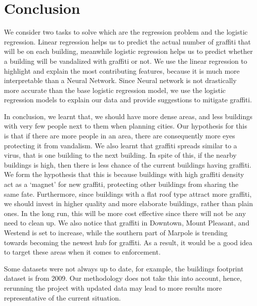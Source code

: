\chapter{Conclusion}

We consider two tasks to solve which are the regression problem and the logistic regression. Linear regression helps us to predict the actual number of graffiti that will be on each building, meanwhile logistic regression helps us to predict whether a building will be vandalized with graffiti or not. We use the linear regression to highlight and explain the most contributing features, because it is much more interpretable than a Neural Network. Since Neural network is not drastically more accurate than the base logistic regression model, we use the logistic regression models to explain our data and provide suggestions to mitigate graffiti.

In conclusion, we learnt that, we should have more dense areas, and less buildings with very few people next to them when planning cities. Our hypothesis for this is that if there are more people in an area, there are consequently more eyes protecting it from vandalism. We also learnt that graffiti spreads similar to a virus, that is one building to the next building. In spite of this, if the nearby buildings is high, then there is less chance of the current buildings having graffiti. We form the hypothesis that this is because buildings with high graffiti density act as a ‘magnet’ for new graffiti, protecting other buildings from sharing the same fate. Furthermore, since buildings with a flat roof type attract more graffiti, we should invest in higher quality and more elaborate buildings, rather than plain ones. In the long run, this will be more cost effective since there will not be any need to clean up. We also notice that graffiti in Downtown, Mount Pleasant, and Westend is set to increase, while the southern part of Marpole is trending towards becoming  the newest hub for graffiti. As a result, it would be a good idea to target these areas when it comes to enforcement.

Some datasets were not always up to date, for example, the buildings footprint dataset is from 2009. Our methodology does not take this into account, hence, rerunning the project with updated data may lead to more results more representative of the current situation.

